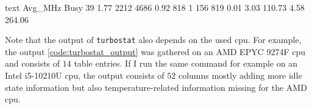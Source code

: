\begin{listing}
    \begin{moderncode}[fontsize=\setfontsize{6.5}]{text}
Avg_MHz  Busy%
39       1.77   2212     4686     0.92  818  1     156  819  0.01   3.03  110.73  4.58     264.06
    \end{moderncode}
    \caption{%
    An example output of the command \texttt{sudo turbostat -n 1 -i 0.001 -S -q} with root privileges enabled for \texttt{turbostat} on an AMD EPYC 9274F \gls{cpu}.
    }
    \label{code:turbostat_output}
\end{listing}
Note that the output of \texttt{turbostat} also depends on the used \gls{cpu}. 
For example, the output \autoref{code:turbostat_output} was gathered on an AMD EPYC 9274F \gls{cpu} and consists of $14$ table entries. 
If I run the same command for example on an Intel i5-10210U \gls{cpu}, the output consists of $52$ columns mostly adding more idle state information but also temperature-related information missing for the AMD \gls{cpu}.
